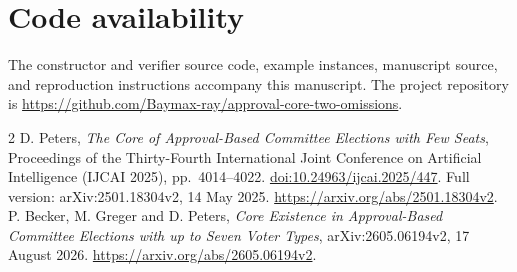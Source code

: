 \documentclass[11pt]{article}
\begin{document}
\section*{Code availability}

The constructor and verifier source code, example instances, manuscript
source, and reproduction instructions accompany this manuscript. The
project repository is
\url{https://github.com/Baymax-ray/approval-core-two-omissions}.

\begin{thebibliography}{2}
D. Peters, \emph{The Core of Approval-Based Committee Elections with Few Seats},
Proceedings of the Thirty-Fourth International Joint Conference on
Artificial Intelligence (IJCAI 2025), pp.~4014--4022.
\href{https://doi.org/10.24963/ijcai.2025/447}{doi:10.24963/ijcai.2025/447}.
Full version: arXiv:2501.18304v2, 14 May 2025.
\url{https://arxiv.org/abs/2501.18304v2}.
P. Becker, M. Greger and D. Peters,
\emph{Core Existence in Approval-Based Committee Elections with up to Seven
Voter Types}, arXiv:2605.06194v2, 17 August 2026.
\url{https://arxiv.org/abs/2605.06194v2}.
\end{thebibliography}
\end{document}
